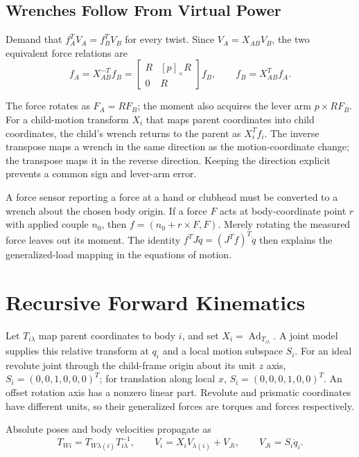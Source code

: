 \subsection{Wrenches Follow From Virtual Power}

Demand that $f_A^T V_A=f_B^T V_B$ for every twist. Since $V_A=X_{AB}V_B$, the two equivalent force relations are
\begin{equation}
 f_A=X_{AB}^{-T}f_B
 =\begin{bmatrix}R&[p]_\times R\\0&R\end{bmatrix}f_B,
 \qquad f_B=X_{AB}^{T}f_A.
 \label{eq:adjoint_force}
\end{equation}

The force rotates as $F_A=RF_B$; the moment also acquires the lever arm $p\times RF_B$. For a child-motion transform $X_i$ that maps parent coordinates into child coordinates, the child's wrench returns to the parent as $X_i^T f_i$. The inverse transpose maps a wrench in the same direction as the motion-coordinate change; the transpose maps it in the reverse direction. Keeping the direction explicit prevents a common sign and lever-arm error.

A force sensor reporting a force at a hand or clubhead must be converted to a wrench about the chosen body origin. If a force $F$ acts at body-coordinate point $r$ with applied couple $n_0$, then $f=(n_0+r\times F,F)$. Merely rotating the measured force leaves out its moment. The identity $f^T J\dot q=(J^Tf)^T\dot q$ then explains the generalized-load mapping in the equations of motion.

\section{Recursive Forward Kinematics}
\label{sec:forward_kinematics}
\label{laymans:recursive_intuition}

Let $T_{i\lambda}$ map parent coordinates to body $i$, and set $X_i=\operatorname{Ad}_{T_{i\lambda}}$. A joint model supplies this relative transform at $q_i$ and a local motion subspace $S_i$. For an ideal revolute joint through the child-frame origin about its unit $z$ axis, $S_i=(0,0,1,0,0,0)^T$; for translation along local $x$, $S_i=(0,0,0,1,0,0)^T$. An offset rotation axis has a nonzero linear part. Revolute and prismatic coordinates have different units, so their generalized forces are torques and forces respectively.

Absolute poses and body velocities propagate as
\begin{equation}
 T_{Wi}=T_{W\lambda(i)}T_{i\lambda}^{-1},\qquad
 V_i=X_iV_{\lambda(i)}+V_{Ji},\qquad V_{Ji}=S_i\dot q_i.
 \label{eq:velocity_recursion}
\end{equation}

